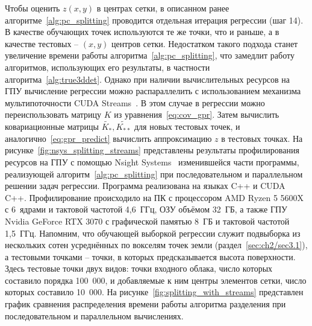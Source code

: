 Чтобы оценить $z(x,y)$ в центрах сетки, в описанном ранее алгоритме~\ref{alg:pc_splitting} проводится отдельная итерация регрессии (шаг 14). В качестве обучающих точек используются те же точки, что и раньше, а в качестве тестовых -- $(x, y)$ центров сетки. Недостатком такого подхода станет увеличение времени работы алгоритма~\ref{alg:pc_splitting}, что замедлит работу алгоритмов, использующих его результаты, в частности алгоритма~\ref{alg:true3ddet}. Однако при наличии вычислительных ресурсов на ГПУ вычисление регрессии можно распараллелить с использованием механизма мультипоточности CUDA Streams~\cite{Rennich}. В этом случае в регрессии можно переиспользовать матрицу $K$ из уравнения~\cref{eq:cov_gpr}. Затем вычислить ковариационные матрицы $\widetilde{K_*}, \widetilde{K_{**}}$ для новых тестовых точек, и аналогично~\cref{eq:gpr_predict} вычислить аппроксимацию $z$ в тестовых точках. На рисунке~\cref{fig:nsys_splitting_streams} представлены результаты профилирования ресурсов на ГПУ с помощью Nsight Systems~\cite{nsight-systems_2025} изменившейся части программы, реализующей алгоритм~\ref{alg:pc_splitting} при последовательном и параллельном решении задач регрессии. Программа реализована на языках C++ и CUDA C++. Профилирование происходило на ПК с процессором AMD Ryzen 5 5600X с 6~ядрами и тактовой частотой 4,6~ГГц, ОЗУ объёмом 32~ГБ, а также ГПУ Nvidia GeForce RTX 3070 с графической памятью 8~ГБ и тактовой частотой 1,5~ГГц. Напомним, что обучающей выборкой регрессии служит подвыборка из нескольких сотен усреднённых по вокселям точек земли (раздел~\cref{sec:ch2/sec3.1}), а тестовыми точками -- точки, в которых предсказывается высота поверхности. Здесь тестовые точки двух видов: точки входного облака, число которых составило порядка 100~000, и добавляемые к ним центры элементов сетки, число которых составило 10~000. На рисунке~\cref{fig:splitting_with_streams} представлен график сравнения распределения времени работы алгоритма разделения при последовательном и параллельном вычислениях.


